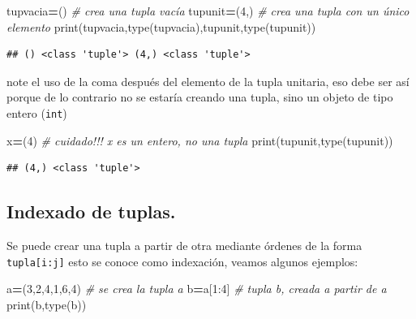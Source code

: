 \documentclass[
]{book}
\newenvironment{Shaded}{\begin{snugshade}}{\end{snugshade}}
\newcommand{\BuiltInTok}[1]{#1}
\newcommand{\CommentTok}[1]{\textcolor[rgb]{0.56,0.35,0.01}{\textit{#1}}}
\newcommand{\DecValTok}[1]{\textcolor[rgb]{0.00,0.00,0.81}{#1}}
\newcommand{\NormalTok}[1]{#1}
\newcommand{\OperatorTok}[1]{\textcolor[rgb]{0.81,0.36,0.00}{\textbf{#1}}}
\theoremstyle{definition}
\theoremstyle{definition}
\theoremstyle{definition}
\theoremstyle{definition}
\theoremstyle{remark}
\begin{document}
\begin{Shaded}
\begin{Highlighting}[]
\NormalTok{tupvacia}\OperatorTok{=}\NormalTok{() }\CommentTok{\# crea una tupla vacía }
\NormalTok{tupunit}\OperatorTok{=}\NormalTok{(}\DecValTok{4}\NormalTok{,) }\CommentTok{\# crea una tupla con un único elemento }
\BuiltInTok{print}\NormalTok{(tupvacia,}\BuiltInTok{type}\NormalTok{(tupvacia),tupunit,}\BuiltInTok{type}\NormalTok{(tupunit))}
\end{Highlighting}
\end{Shaded}

\begin{verbatim}
## () <class 'tuple'> (4,) <class 'tuple'>
\end{verbatim}

note el uso de la coma después del elemento de la tupla unitaria, eso debe ser así porque de lo contrario no se estaría creando una tupla, sino un objeto de tipo entero (\texttt{int})

\begin{Shaded}
\begin{Highlighting}[]
\NormalTok{x}\OperatorTok{=}\NormalTok{(}\DecValTok{4}\NormalTok{) }\CommentTok{\# cuidado!!! x es un entero, no una tupla  }
\BuiltInTok{print}\NormalTok{(tupunit,}\BuiltInTok{type}\NormalTok{(tupunit))}
\end{Highlighting}
\end{Shaded}

\begin{verbatim}
## (4,) <class 'tuple'>
\end{verbatim}

\hypertarget{indexado-de-tuplas.}{%
\subsection{Indexado de tuplas.}\label{indexado-de-tuplas.}}

Se puede crear una tupla a partir de otra mediante órdenes de la forma \texttt{tupla{[}i:j{]}} esto se conoce como indexación, veamos algunos ejemplos:

\begin{Shaded}
\begin{Highlighting}[]
\NormalTok{a}\OperatorTok{=}\NormalTok{(}\DecValTok{3}\NormalTok{,}\DecValTok{2}\NormalTok{,}\DecValTok{4}\NormalTok{,}\DecValTok{1}\NormalTok{,}\DecValTok{6}\NormalTok{,}\DecValTok{4}\NormalTok{) }\CommentTok{\# se crea la tupla a }
\NormalTok{b}\OperatorTok{=}\NormalTok{a[}\DecValTok{1}\NormalTok{:}\DecValTok{4}\NormalTok{] }\CommentTok{\# tupla b, creada a partir de a }
\BuiltInTok{print}\NormalTok{(b,}\BuiltInTok{type}\NormalTok{(b))}
\end{Highlighting}
\end{Shaded}
\end{document}
